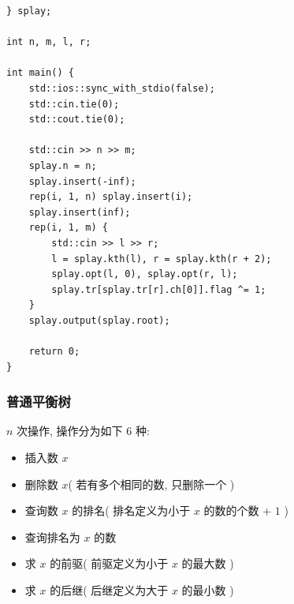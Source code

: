 \documentclass[UTF8, a4paper, titlepage, twoside]{ctexart}
\begin{document}
\begin{lstlisting}
} splay;

int n, m, l, r;

int main() {
    std::ios::sync_with_stdio(false);
    std::cin.tie(0);
    std::cout.tie(0);

    std::cin >> n >> m;
    splay.n = n;
    splay.insert(-inf);
    rep(i, 1, n) splay.insert(i);
    splay.insert(inf);
    rep(i, 1, m) {
        std::cin >> l >> r;
        l = splay.kth(l), r = splay.kth(r + 2);
        splay.opt(l, 0), splay.opt(r, l);
        splay.tr[splay.tr[r].ch[0]].flag ^= 1;
    }
    splay.output(splay.root);

    return 0;
}
\end{lstlisting}

\subsubsection{ 普通平衡树 }
$n$ 次操作, 操作分为如下 $6$ 种: 
\begin{itemize}
 	\item 插入数 $x$
 	\item 删除数 $x$( 若有多个相同的数, 只删除一个 )
 	\item 查询数 $x$ 的排名( 排名定义为小于 $x$ 的数的个数 $+$ $1$ )
 	\item 查询排名为 $x$ 的数
 	\item 求 $x$ 的前驱( 前驱定义为小于 $x$ 的最大数 )
 	\item 求 $x$ 的后继( 后继定义为大于 $x$ 的最小数 )
\end{itemize}
\end{document}
